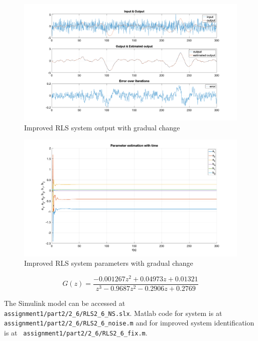 \begin{figure}
	\centering
	\includegraphics[totalheight=8cm]{images/RLSISGCFixedOutput.png}
	\caption{Improved RLS system output with gradual change}
	\label{fig:RLSISGCFixedOutput}
\end{figure}
\begin{figure}
	\centering
	\includegraphics[totalheight=8cm]{images/RLSISGCFixedParams.png}
	\caption{Improved RLS system parameters with gradual change}
	\label{fig:RLSISGCFixedOutputParams}
\end{figure}
\begin{equation}
	G(z) =	\frac{-0.001267 z^2 + 0.04973 z + 0.01321}{z^3 - 0.9687 z^2 - 0.2906 z + 0.2769}
	\label{eq:RLSISGCFixedTransferFunction}
\end{equation}

The Simulink model can be accessed at \hspace{-1ex}\lstinline| assignment1/part2/2_6/RLS2_6_NS.slx|.
Matlab code for system is at \hspace{-1ex}\lstinline| assignment1/part2/2_6/RLS2_6_noise.m| and for improved system identification is at \hspace{-1ex}\lstinline| assignment1/part2/2_6/RLS2_6_fix.m|.